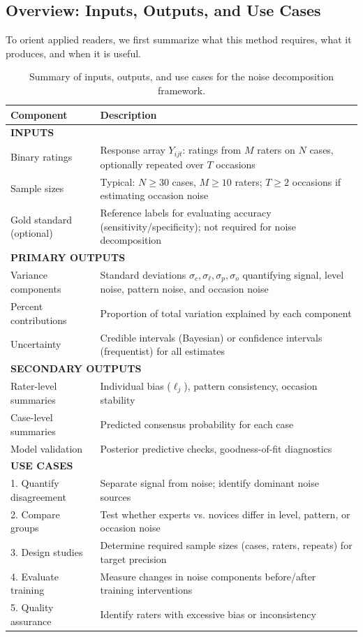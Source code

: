 \documentclass[num-refs]{wiley-article}
\begin{document}
\subsection*{Overview: Inputs, Outputs, and Use Cases}

To orient applied readers, we first summarize what this method requires, what it produces, and when it is useful.

\begin{table}[h!]
\centering
\small
\begin{tabular}{p{}p{}}
\toprule
\textbf{Component} & \textbf{Description} \\
\midrule
\multicolumn{2}{l}{\textbf{INPUTS}} \\
Binary ratings & Response array $Y_{ijt}$: ratings from $M$ raters on $N$ cases, optionally repeated over $T$ occasions \\
Sample sizes & Typical: $N \geq 30$ cases, $M \geq 10$ raters; $T \geq 2$ occasions if estimating occasion noise \\
Gold standard (optional) & Reference labels for evaluating accuracy (sensitivity/specificity); not required for noise decomposition \\
\midrule
\multicolumn{2}{l}{\textbf{PRIMARY OUTPUTS}} \\
Variance components & Standard deviations $\sigma_c, \sigma_\ell, \sigma_p, \sigma_o$ quantifying signal, level noise, pattern noise, and occasion noise \\
Percent contributions & Proportion of total variation explained by each component \\
Uncertainty & Credible intervals (Bayesian) or confidence intervals (frequentist) for all estimates \\
\midrule
\multicolumn{2}{l}{\textbf{SECONDARY OUTPUTS}} \\
Rater-level summaries & Individual bias ($\ell_j$), pattern consistency, occasion stability \\
Case-level summaries & Predicted consensus probability for each case \\
Model validation & Posterior predictive checks, goodness-of-fit diagnostics \\
\midrule
\multicolumn{2}{l}{\textbf{USE CASES}} \\
1. Quantify disagreement & Separate signal from noise; identify dominant noise sources \\
2. Compare groups & Test whether experts vs. novices differ in level, pattern, or occasion noise \\
3. Design studies & Determine required sample sizes (cases, raters, repeats) for target precision \\
4. Evaluate training & Measure changes in noise components before/after training interventions \\
5. Quality assurance & Identify raters with excessive bias or inconsistency \\
\bottomrule
\end{tabular}
\caption{Summary of inputs, outputs, and use cases for the noise decomposition framework.}
\label{tab:overview}
\end{table}
\end{document}
